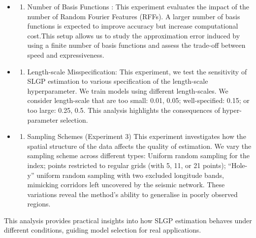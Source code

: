 \documentclass[
]{article}
\providecommand{\tightlist}{%
  \setlength{\itemsep}{0pt}\setlength{\parskip}{0pt}}
\begin{document}
\begin{itemize}
\tightlist
\item
  \begin{enumerate}
  \def\labelenumi{\arabic{enumi}.}
  \tightlist
  \item
    Number of Basis Functions : This experiment evaluates the impact of the number of Random Fourier Features (RFFs). A larger number of basis functions is expected to improve accuracy but increase computational cost.This setup allows us to study the approximation error induced by using a finite number of basis functions and assess the trade-off between speed and expressiveness.
  \end{enumerate}
\item
  \begin{enumerate}
  \def\labelenumi{\arabic{enumi}.}
  \setcounter{enumi}{1}
  \tightlist
  \item
    Length-scale Misspecification: This experiment, we test the sensitivity of SLGP estimation to various specification of the length-scale hyperparameter. We train models using different length-scales. We consider length-scale that are too small: 0.01, 0.05; well-specified: 0.15; or too large: 0.25, 0.5.
    This analysis highlights the consequences of hyper-parameter selection.
  \end{enumerate}
\item
  \begin{enumerate}
  \def\labelenumi{\arabic{enumi}.}
  \setcounter{enumi}{2}
  \tightlist
  \item
    Sampling Schemes (Experiment 3)
    This experiment investigates how the spatial structure of the data affects the quality of estimation. We vary the sampling scheme across different types: Uniform random sampling for the index; points restricted to regular grids (with 5, 11, or 21 points); ``Hole-y'' uniform random sampling with two excluded longitude bands, mimicking corridors left uncovered by the seismic network.
    These variations reveal the method's ability to generalise in poorly observed regions.
  \end{enumerate}
\end{itemize}

This analysis provides practical insights into how SLGP estimation behaves under different conditions, guiding model selection for real applications.
\end{document}
